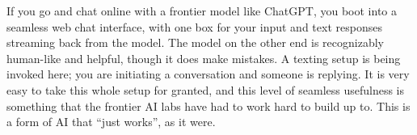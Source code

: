 

If you go and chat online with a frontier model like ChatGPT, you boot into a
seamless web chat interface, with one box for your input and text responses
streaming back from the model. The model on the other end is recognizably
human-like and helpful, though it does make mistakes. A texting setup is being
invoked here; you are initiating a conversation and someone is replying. It is
very easy to take this whole setup for granted, and this level of seamless
usefulness is something that the frontier AI labs have had to work hard to
build up to. This is a form of AI that ``just works'', as it were.

